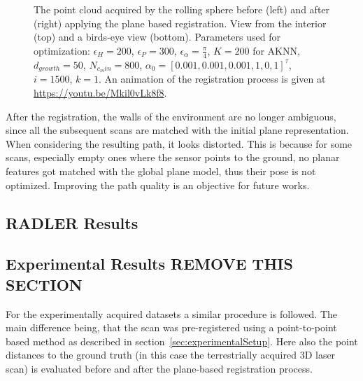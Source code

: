 \begin{figure}
        \caption{The point cloud acquired by the rolling sphere before (left) and after (right) applying the plane based registration. View from the interior (top) and a birds-eye view (bottom). Parameters used for optimization: $\epsilon_H = 200$, $\epsilon_P = 300$, $\epsilon_\alpha = \frac{\pi}{4}$, $K = 200$ for AKNN, $d_{growth} = 50$, $N_{c_min} = 800$, $\alpha_0 = [0.001, 0.001, 0.001, 1, 0, 1]^\tau$, $i = 1500$, $k = 1$. An animation of the registration process is given at \url{https://youtu.be/Mkil0vLk8f8}.}
        \label{fig:jasperhome}
\end{figure}
After the registration, the walls of the environment are no longer ambiguous, since all the subsequent scans are matched with the initial plane representation.
When considering the resulting path, it looks distorted.
This is because for some scans, especially empty ones where the sensor points to the ground, no planar features got matched with the global plane model, thus their pose is not optimized.
Improving the path quality is an objective for future works.

\iffalse
	\subsection{RADLER Results}

	\subsection{Experimental Results REMOVE THIS SECTION}

	For the experimentally acquired datasets a similar procedure is followed. 
	The main difference being, that the scan was pre-registered using a point-to-point based method as described in section~\ref{sec:experimentalSetup}. 
	Here also the point distances to the ground truth (in this case the terrestrially acquired 3D laser scan) is evaluated before and after the plane-based registration process. 

